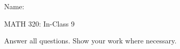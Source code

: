 \documentclass{article}
\begin{document}
\hspace{375pt}Name:

\begin{center}
{\Huge MATH 320: In-Class 9}

\end{center}

\bigskip\bigskip


Answer all questions. Show your work where necessary.\bigskip

\end{document}
